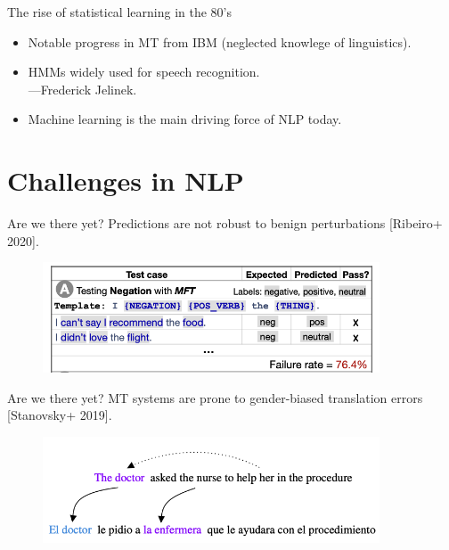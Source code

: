\documentclass[usenames,dvipsnames,notes]{beamer}
\begin{document}
\begin{frame}
    {The rise of statistical learning in the 80's}
    \begin{itemize}
        \itemsep1em
        \item Notable progress in MT from IBM (neglected knowlege of linguistics).
        \item HMMs widely used for speech recognition.\\
            ---Frederick Jelinek.
        \item Machine learning is the main driving force of NLP today.
    \end{itemize}
\end{frame}

\section{Challenges in NLP}
\begin{frame}
    {Are we there yet?}
    Predictions are not robust to benign perturbations [Ribeiro+ 2020].
    \begin{figure}
        \includegraphics[width=10cm]{figures/checklist}
    \end{figure}
\end{frame}

\begin{frame}
    {Are we there yet?}
    MT systems are prone to gender-biased translation errors [Stanovsky+ 2019].
    \begin{figure}
        \includegraphics[width=10cm]{figures/gender-bias-example}
    \end{figure}
\end{frame}
\end{document}
